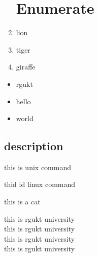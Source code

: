 \documentclass{article}
\begin{document}
	\begin{enumerate} 
	\section{Enumerate}
	
	\item lion
	
	\item tiger
	\item giraffe
\end{enumerate}
\begin{itemize}
	\section{itemize}
	\item rgukt
	\item hello
	\item world
  \end{itemize}
  \begin{description}
  	\section{description}
  	\item[unix] this is unix command
  	\item[linux] thid id linux command
  	\item[cat] this is a cat
  	
  	\large this is rgukt university\\
  	\LARGE this is rgukt university\\
  	\huge this is rgukt university\\
  	\Huge this is rgukt university\\
  	
  \end{description}
\end{document}
